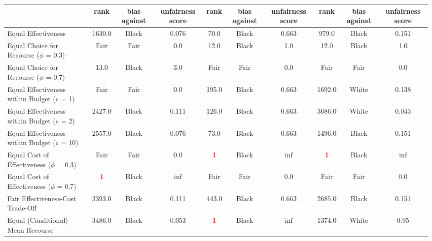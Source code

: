 \documentclass{article}
\begin{document}
\begin{table}[ht]
{\begin{tabular}{lccccccccc}
\multicolumn{1}{c}{} & \multicolumn{1}{c}{rank} & \multicolumn{1}{c}{bias against} & \multicolumn{1}{c}{unfairness score} & \multicolumn{1}{c}{rank} & \multicolumn{1}{c}{bias against} & \multicolumn{1}{c}{unfairness score} & \multicolumn{1}{c}{rank} & \multicolumn{1}{c}{bias against} & \multicolumn{1}{c}{unfairness score} \\ \midrule
Equal Effectiveness & 1630.0 & Black & 0.076 & 70.0 & Black & 0.663 & 979.0 & Black & 0.151 \\
Equal Choice for Recourse ($\phi$ = 0.3) & Fair & Fair & 0.0 & 12.0 & Black & 1.0 & 12.0 & Black & 1.0 \\
Equal Choice for Recourse ($\phi$ = 0.7) & 13.0 & Black & 3.0 & Fair & Fair & 0.0 & Fair & Fair & 0.0 \\
Equal Effectiveness within Budget (c = 1) & Fair & Fair & 0.0 & 195.0 & Black & 0.663 & 1692.0 & White & 0.138 \\
Equal Effectiveness within Budget (c = 2) & 2427.0 & Black & 0.111 & 126.0 & Black & 0.663 & 3686.0 & White & 0.043 \\
Equal Effectiveness within Budget (c = 10) & 2557.0 & Black & 0.076 & 73.0 & Black & 0.663 & 1496.0 & Black & 0.151 \\
Equal Cost of Effectiveness ($\phi$ = 0.3) & Fair & Fair & 0.0 & \textbf{\textcolor{red}{1}} & Black & inf & \textbf{\textcolor{red}{1}} & Black & inf \\
Equal Cost of Effectiveness ($\phi$ = 0.7) & \textbf{\textcolor{red}{1}} & Black & inf & Fair & Fair & 0.0 & Fair & Fair & 0.0 \\
Fair Effectiveness-Cost Trade-Off & 3393.0 & Black & 0.111 & 443.0 & Black & 0.663 & 2685.0 & Black & 0.151 \\
Equal (Conditional) Mean Recourse & 3486.0 & Black & 0.053 & \textbf{\textcolor{red}{1}} & Black & inf & 1374.0 & White & 0.95 \\


\bottomrule
\end{tabular}%
}
\end{table}
\end{document}
